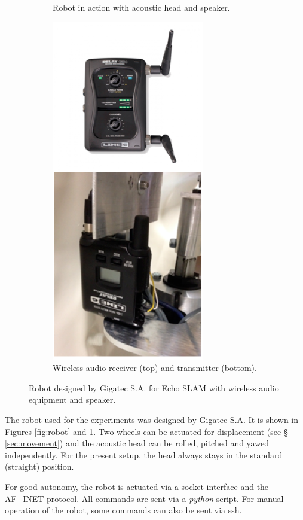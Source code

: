 \begin{figure}
\begin{subfigure}{0.3\linewidth}
        \caption{Robot in action with acoustic head and speaker.}
        \label{fig:robot_action}
    \end{subfigure}
    \hspace{0.5em}
    \begin{subfigure}{0.3\linewidth}
        \centering
        \includegraphics[height=0.3\textheight]{files/Wireless.png}
        \caption{Wireless audio receiver (top) and transmitter (bottom).}
        \label{fig:audio}
    \end{subfigure}
    \caption{Robot designed by Gigatec S.A. for Echo SLAM with wireless audio equipment and speaker.}
\end{figure}

The robot used for the experiments was designed by Gigatec S.A. It is shown in Figures \ref{fig:robot} and \ref{fig:robot_action}.
Two wheels can be actuated for displacement (see § \ref{sec:movement}) and the acoustic head can be rolled, pitched and yawed independently. 
For the present setup, the head always stays in the standard (straight) position.

For good autonomy, the robot is actuated via a socket interface and the AF\_INET protocol. All commands are sent via a \textit{python} script. For manual operation of the robot, some commands can also be sent via ssh.
